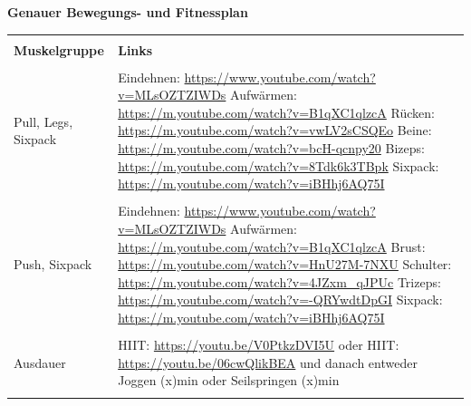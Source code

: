 \newline
\pagebreak
\newline
\textbf{Genauer Bewegungs- und Fitnessplan}
\newline
\begin{table}[htp]
  \begin{tabularx}{\textwidth}{l X}\hline \\
    \textbf{Muskelgruppe} & \textbf{Links}  \\\hline \\
    Pull, Legs, Sixpack & Eindehnen: \url{https://www.youtube.com/watch?v=MLsOZTZIWDs}
    \newline
    Aufwärmen: \url{https://m.youtube.com/watch?v=B1qXC1qlzcA}
    \newline
    Rücken: \url{https://m.youtube.com/watch?v=vwLV2sCSQEo}
    \newline
    Beine: \url{https://m.youtube.com/watch?v=bcH-qcnpy20}
    \newline
    Bizeps: \url{https://m.youtube.com/watch?v=8Tdk6k3TBpk}
    \newline
    Sixpack: \url{https://m.youtube.com/watch?v=iBHhj6AQ75I} \\ \\
    Push, Sixpack & Eindehnen: \url{https://www.youtube.com/watch?v=MLsOZTZIWDs}
    \newline
    Aufwärmen: \url{https://m.youtube.com/watch?v=B1qXC1qlzcA}
    \newline
    Brust: \url{https://m.youtube.com/watch?v=HnU27M-7NXU}
    \newline
    Schulter: \url{https://m.youtube.com/watch?v=4JZxm_qJPUc}
    \newline
    Trizeps: \url{https://m.youtube.com/watch?v=-QRYwdtDpGI}
    \newline
    Sixpack: \url{https://m.youtube.com/watch?v=iBHhj6AQ75I} \\ \\
    Ausdauer & HIIT: \url{https://youtu.be/V0PtkzDVI5U}
    \newline
    oder
    \newline
    HIIT: \url{https://youtu.be/06cwQlikBEA}
    \newline
    und danach entweder Joggen (x)min oder Seilspringen (x)min \\
    \\\hline
  \end{tabularx}
\end{table}
